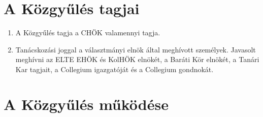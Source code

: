 \documentclass{../styles/rulebook}
\begin{document}
\section{A Közgyűlés tagjai}

\begin{enumerate}
	\item A Közgyűlés tagja a CHÖK valamennyi tagja.
	\item Tanácskozási joggal a választmányi elnök által meghívott személyek. Javasolt meghívni az ELTE EHÖK és KolHÖK elnökét, a Baráti Kör elnökét, a Tanári Kar tagjait, a Collegium igazgatóját és a Collegium gondnokát.
\end{enumerate}

\section{A Közgyűlés működése}
\end{document}
